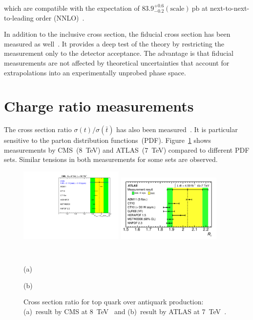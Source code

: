 \documentclass{PoS}
\begin{document}
which are compatible with the expectation of $83.9_{-0.2}^{+0.6}\mathrm{(scale)}~\mathrm{pb}$ at next-to-next-to-leading order (NNLO)~\cite{Brucherseifer-xsec8}.

In addition to the inclusive cross section, the fiducial cross section has been measured as well~\cite{atlas-xsec8,CMS-PAS-TOP-15-007}. It provides a deep test of the theory by restricting the measurement only to the detector acceptance. The advantage is that fiducial measurements are not affected by theoretical uncertainties that account for extrapolations into an experimentally unprobed phase space.





\section{Charge ratio measurements}
The cross section ratio $\sigma(t)/\sigma(\bar{t})$ has also been measured~\cite{cms-xsec8,atlas-charge7}. It is particular sensitive to the parton distribution functions~(PDF). Figure~\ref{fig:charge-ratio} shows measurements by CMS~(8~TeV) and ATLAS~(7~TeV) compared to different PDF sets. Similar tensions in both measurements for some sets are observed. 

\begin{figure}[htbp]
\begin{center}
\parbox{0.47\textwidth}{\centering\includegraphics[width=0.46\textwidth]{cms_xsec8/charge.pdf}}
\parbox{0.47\textwidth}{\centering\includegraphics[width=0.46\textwidth]{atlas_charge7/charge.pdf}}\\
\parbox{0.47\textwidth}{\centering (a)}
\parbox{0.47\textwidth}{\centering (b)}
\end{center}
\caption{\label{fig:charge-ratio}Cross section ratio for top quark over antiquark production: (a)~result by CMS at 8~TeV~\cite{cms-xsec8} and (b)~result by ATLAS at 7~TeV~\cite{atlas-charge7}.}

\end{figure}
\end{document}
